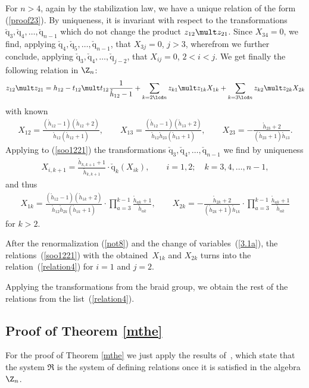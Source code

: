 \documentclass[pdftex]{sigma}
\def\nplus{\mathfrak{n}}\def\nn{\nonumber}\def\nin{\noindent}
\def\q{\check{\mathrm q}}\def\Q{\mathrm{Q}}\def\r#1{(\ref{#1})}\let\rf=\r
\def\s{z}\def\S{\mathrm {S}}\def\si{\sigma}\def\Sp{\S^{\nplus}}\def\sy{\acute{\sigma}}\def\th{\mathring{h}}
\numberwithin{equation}{section}
\begin{document}
For $n>4$, again by the stabilization law, we have a unique relation of the form \rf{proof23}. By uniqueness, it is invariant with respect to the
transformations $\q_3,\q_4,\dots ,\q_{n-1}$ which do not change the product $\s_{12}\mult \s_{21}$. Since $X_{34}=0$, we f\/ind, applying
$\q_4, \q_5, \dots ,\q_{n-1}$,  that  $X_{3j}=0$, $j>3$, wherefrom we further conclude, applying $\q_3,\q_4,\dots ,\q_{j-2}$, that
$X_{ij}=0$, $2<i<j$. We get f\/inally the following relation in $\Z_n$:
\begin{gather} \label{soo1221}
\s_{12}\mult \s_{21}=h_{12}-t_{12}\mult t_{12} \frac{1}{\th_{12}-1}
+\sum_{k=2\lcd n}\s_{k1}\mult\s_{1k}X_{1k}+\sum_{k=3\lcd n}\s_{k2}\mult\s_{2k}X_{2k}
\end{gather}
with known
\begin{gather*}
X_{12}=\frac{(\th_{12}-1)(\th_{12} +2)}{\th_{12}(\th_{12} +1)} ,\qquad
X_{13}=\frac{(\th_{12}-1) (\th_{13} +2)}{\th_{12}\th_{23}(\th_{13}+1)} ,\qquad
X_{23}=-\frac{\th_{23} +2}{(\th_{23} +1)\th_{13}} .
\end{gather*}
Applying to \rf{soo1221} the transformations $\q_3, \q_4,\dots ,\q_{n-1}$ we f\/ind by uniqueness
\begin{gather*}X_{i,k+1}=\frac{\th_{k,k+1}+1}{\th_{k,k+1}} \cdot\q_k(X_{ik}) ,\qquad i=1,2 ;\quad k=3,4,\dots ,n-1 ,
\end{gather*}
and thus
\begin{gather*}
 X_{1k}=\frac{(\th_{12}-1) (\th_{1k} +2)}{\th_{12}\th_{2k}(\th_{1k}+1)}\cdot\prod_{a=3}^{k-1}\frac{\th_{ak}+1}{\th_{ak}}  ,
\qquad X_{2k}=-\frac{\th_{2k} +2}{(\th_{2k} +1)\th_{1k}}\cdot\prod_{a=3}^{k-1}\frac{\th_{ak}+1}{\th_{ak}}
\end{gather*}
for $k>2$.


After the renormalization \rf{not8} and the change of variables~\rf{3.1a}, the relations~\rf{soo1221}  with the
obtained~$X_{1k}$ and $X_{2k}$ turns into the relation~\rf{relation4} for $i=1$ and $j=2$.


Applying the transformations from the braid group, we obtain the rest of the relations from the list~\rf{relation4}.

\subsection{Proof of Theorem \ref{mthe}}\label{proofmain}

For the proof of Theorem \ref{mthe} we just apply the results of~\cite{KO3}, which state that the system ${\mathfrak R}$ is the system of
def\/ining relations once it is satisf\/ied in the algebra $\Z_n$.
\end{document}
